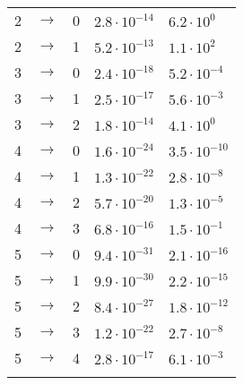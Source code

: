 \begin{longtable}[!htb]{rclll}
    2 & $\rightarrow$ & 0 & $2.8 \cdot 10^{-14}$ & $6.2 \cdot 10^{0}$   \\
    2 & $\rightarrow$ & 1 & $5.2 \cdot 10^{-13}$ & $1.1 \cdot 10^{2}$   \\
    3 & $\rightarrow$ & 0 & $2.4 \cdot 10^{-18}$ & $5.2 \cdot 10^{-4}$  \\
    3 & $\rightarrow$ & 1 & $2.5 \cdot 10^{-17}$ & $5.6 \cdot 10^{-3}$  \\
    3 & $\rightarrow$ & 2 & $1.8 \cdot 10^{-14}$ & $4.1 \cdot 10^{0}$   \\
    4 & $\rightarrow$ & 0 & $1.6 \cdot 10^{-24}$ & $3.5 \cdot 10^{-10}$ \\
    4 & $\rightarrow$ & 1 & $1.3 \cdot 10^{-22}$ & $2.8 \cdot 10^{-8}$  \\
    4 & $\rightarrow$ & 2 & $5.7 \cdot 10^{-20}$ & $1.3 \cdot 10^{-5}$  \\
    4 & $\rightarrow$ & 3 & $6.8 \cdot 10^{-16}$ & $1.5 \cdot 10^{-1}$  \\
    5 & $\rightarrow$ & 0 & $9.4 \cdot 10^{-31}$ & $2.1 \cdot 10^{-16}$ \\
    5 & $\rightarrow$ & 1 & $9.9 \cdot 10^{-30}$ & $2.2 \cdot 10^{-15}$ \\
    5 & $\rightarrow$ & 2 & $8.4 \cdot 10^{-27}$ & $1.8 \cdot 10^{-12}$ \\
    5 & $\rightarrow$ & 3 & $1.2 \cdot 10^{-22}$ & $2.7 \cdot 10^{-8}$  \\
    5 & $\rightarrow$ & 4 & $2.8 \cdot 10^{-17}$ & $6.1 \cdot 10^{-3}$  \\
    \hline\hline                                                        \\
\end{longtable}


